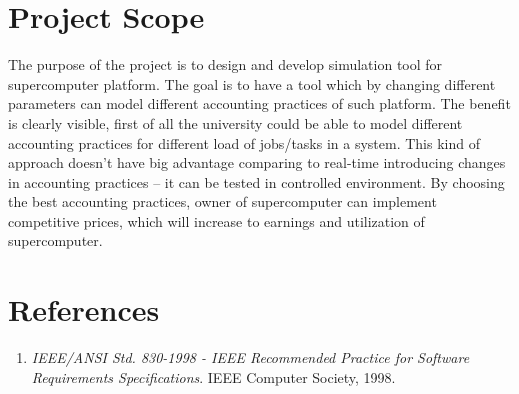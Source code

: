 \section{Project Scope}
	\begin{comment}
		$<$Provide a short description of the software being specified and its purpose, 
		including relevant benefits, objectives, and goals. Relate the software to 
		corporate goals or business strategies. If a separate vision and scope document 
		is available, refer to it rather than duplicating its contents here.$>$
	\end{comment}
	The purpose of the project is to design and develop simulation tool for supercomputer platform. The goal is to have a tool which by changing different parameters can model different accounting practices of such platform. The benefit is clearly visible, first of all the university could be able to model different accounting practices for different load of jobs/tasks in a system. This kind of approach doesn't have big advantage comparing to real-time introducing changes in accounting practices -- it can be tested in controlled environment. By choosing the best accounting practices, owner of supercomputer can implement competitive prices, which will increase to earnings and utilization of supercomputer.

\section{References}
	\begin{comment}
		$<$List any other documents or Web addresses to which this SRS refers. These may 
		include user interface style guides, contracts, standards, system requirements 
		specifications, use case documents, or a vision and scope document. Provide 
		enough information so that the reader could access a copy of each reference, 
		including title, author, version number, date, and source or location.$>$
	\end{comment}
	
	\begin{enumerate}
		\item \emph{IEEE/ANSI Std. 830-1998 - IEEE Recommended Practice for Software Requirements Specifications}. IEEE Computer Society, 1998.
	\end{enumerate}